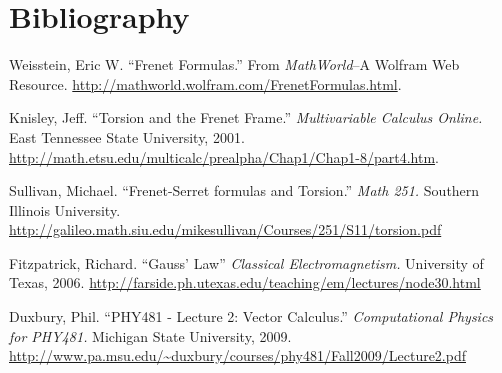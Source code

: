 \documentclass[12pt,letterpaper,english]{article}
\begin{document}




\section{Bibliography}

\begin{thebibliography}{56}

  Weisstein, Eric W. ``Frenet Formulas.'' From \emph{MathWorld}--A Wolfram Web Resource. \url{http://mathworld.wolfram.com/FrenetFormulas.html}.

  Knisley, Jeff. ``Torsion and the Frenet Frame.'' \emph{Multivariable Calculus Online.} East Tennessee State University, 2001. \url{http://math.etsu.edu/multicalc/prealpha/Chap1/Chap1-8/part4.htm}.

  Sullivan, Michael. ``Frenet-Serret formulas and Torsion.'' \emph{Math 251.} Southern Illinois University. \url{http://galileo.math.siu.edu/mikesullivan/Courses/251/S11/torsion.pdf}

  Fitzpatrick, Richard. ``Gauss' Law'' \emph{Classical Electromagnetism.} University of Texas, 2006. \url{http://farside.ph.utexas.edu/teaching/em/lectures/node30.html}

  Duxbury, Phil. ``PHY481 - Lecture 2: Vector Calculus.'' \emph{Computational Physics for PHY481.} Michigan State University, 2009. \url{http://www.pa.msu.edu/~duxbury/courses/phy481/Fall2009/Lecture2.pdf}

\end{thebibliography}
\end{document}
